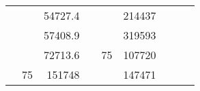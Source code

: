 \begin{table}[]
\begin{tabular}{|ccrccrccc}
\multicolumn{1}{|c|}{\cellcolor[HTML]{FFFFC7}}                                & \multicolumn{1}{c|}{\cellcolor[HTML]{DAE8FC}}                      & \multicolumn{1}{r|}{\cellcolor[HTML]{DAE8FC}54727.4}   & \multicolumn{1}{c|}{\cellcolor[HTML]{FFFFC7}}                                & \multicolumn{1}{c|}{\cellcolor[HTML]{DAE8FC}}                       & \multicolumn{1}{r|}{\cellcolor[HTML]{DDFDFF}214437}    &                                                                              &                                                                    &                                                        \\ \cline{3-3} \cline{6-6}
\multicolumn{1}{|c|}{\cellcolor[HTML]{FFFFC7}}                                & \multicolumn{1}{c|}{\cellcolor[HTML]{DAE8FC}}                      & \multicolumn{1}{r|}{\cellcolor[HTML]{DDFDFF}57408.9}   & \multicolumn{1}{c|}{\cellcolor[HTML]{FFFFC7}}                                & \multicolumn{1}{c|}{\cellcolor[HTML]{DAE8FC}}                       & \multicolumn{1}{r|}{\cellcolor[HTML]{DAE8FC}319593}    &                                                                              &                                                                    &                                                        \\ \cline{3-3} \cline{6-6}
\multicolumn{1}{|c|}{\cellcolor[HTML]{FFFFC7}}                                & \multicolumn{1}{c|}{\cellcolor[HTML]{DAE8FC}}                      & \multicolumn{1}{r|}{\cellcolor[HTML]{DAE8FC}72713.6}   & \multicolumn{1}{c|}{\cellcolor[HTML]{FFFFC7}}                                & \multicolumn{1}{c|}{\multirow{-10}{*}{\cellcolor[HTML]{DAE8FC}75}}  & \multicolumn{1}{r|}{\cellcolor[HTML]{DDFDFF}107720}    &                                                                              &                                                                    &                                                        \\ \cline{3-3} \cline{5-6}
\multicolumn{1}{|c|}{\cellcolor[HTML]{FFFFC7}}                                & \multicolumn{1}{c|}{\multirow{-10}{*}{\cellcolor[HTML]{DAE8FC}75}} & \multicolumn{1}{r|}{\cellcolor[HTML]{DDFDFF}151748}    & \multicolumn{1}{c|}{\cellcolor[HTML]{FFFFC7}}                                & \multicolumn{1}{c|}{\cellcolor[HTML]{DDFDFF}}                       & \multicolumn{1}{r|}{\cellcolor[HTML]{DAE8FC}147471}    &                                                                              &                                                                    &                                                        \\ \cline{2-3} \cline{6-6}

\end{tabular}
\end{table}
